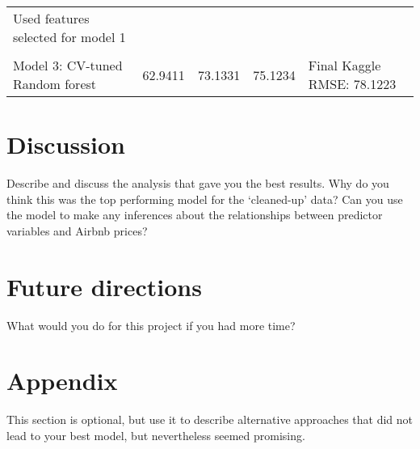 \documentclass[11pt,]{article}
\begin{document}
\begin{longtable}[]{@{}lllll@{}}
\begin{minipage}[t]{0.22\columnwidth}
Used features selected for model 1\strut
\end{minipage}\tabularnewline
\begin{minipage}[t]{0.20\columnwidth}\raggedright\strut
\strut
\end{minipage} & \begin{minipage}[t]{0.14\columnwidth}\raggedright\strut
\strut
\end{minipage} & \begin{minipage}[t]{0.20\columnwidth}\raggedright\strut
\strut
\end{minipage} & \begin{minipage}[t]{0.10\columnwidth}\raggedright\strut
\strut
\end{minipage} & \begin{minipage}[t]{0.22\columnwidth}\raggedright\strut
\strut
\end{minipage}\tabularnewline
\begin{minipage}[t]{0.20\columnwidth}\raggedright\strut
Model 3: CV-tuned Random forest\strut
\end{minipage} & \begin{minipage}[t]{0.14\columnwidth}\raggedright\strut
62.9411\strut
\end{minipage} & \begin{minipage}[t]{0.20\columnwidth}\raggedright\strut
73.1331\strut
\end{minipage} & \begin{minipage}[t]{0.10\columnwidth}\raggedright\strut
75.1234\strut
\end{minipage} & \begin{minipage}[t]{0.22\columnwidth}\raggedright\strut
Final Kaggle RMSE: 78.1223\strut
\end{minipage}\tabularnewline
\bottomrule
\end{longtable}

\section{Discussion}\label{discussion}

Describe and discuss the analysis that gave you the best results. Why do
you think this was the top performing model for the `cleaned-up' data?
Can you use the model to make any inferences about the relationships
between predictor variables and Airbnb prices?

\section{Future directions}\label{future-directions}

What would you do for this project if you had more time?

\section{Appendix}\label{appendix}

This section is optional, but use it to describe alternative approaches
that did not lead to your best model, but nevertheless seemed promising.
\end{document}
